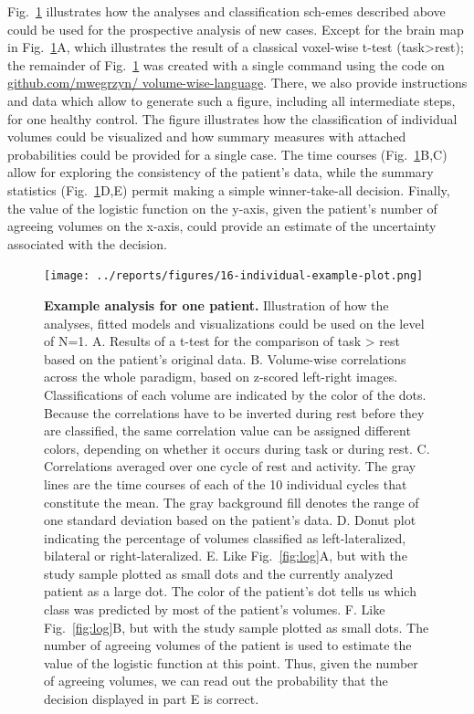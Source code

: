 \documentclass[fleqn,10pt]{SelfArx} %
\begin{document}
Fig.~\ref{fig:case} illustrates how the analyses and classification sch-emes described above could be used for the prospective analysis of new cases. Except for the brain map in Fig.~\ref{fig:case}A, which illustrates the result of a classical voxel-wise t-test (task>rest); the remainder of Fig.~\ref{fig:case} was created with a single command using the code on \href{https://github.com/mwegrzyn/volume-wise-language}{github.com/mwegrzyn/ volume-wise-language}. There, we also provide instructions and data which allow to generate such a figure, including all intermediate steps, for one healthy control. The figure illustrates how the classification of individual volumes could be visualized and how summary measures with attached probabilities could be provided for a single case. The time courses (Fig.~\ref{fig:case}B,C) allow for exploring the consistency of the patient’s data, while the summary statistics (Fig.~\ref{fig:case}D,E) permit making a simple winner-take-all decision. Finally, the value of the logistic function on the y-axis, given the patient’s number of agreeing volumes on the x-axis, could provide an estimate of the uncertainty associated with the decision.


\begin{figure}[htbp]
	\begin{minipage}{\textwidth}
		\renewcommand{\familydefault}{\sfdefault}\normalfont
		\centering
		\texttt{[image: ../reports/figures/16-individual-example-plot.png]}
		\caption{\textbf{Example analysis for one patient.} Illustration of how the analyses, fitted models and visualizations could be used on the level of N=1.
			A. Results of a t-test for the comparison of task > rest based on the patient’s original data.
			B. Volume-wise correlations across the whole paradigm, based on z-scored left-right images. Classifications of each volume are indicated by the color of the dots. Because the correlations have to be inverted during rest before they are classified, the same correlation value can be assigned different colors, depending on whether it occurs during task or during rest.
			C. Correlations averaged over one cycle of rest and activity. The gray lines are the time courses of each of the 10 individual cycles that constitute the mean. The gray background fill denotes the range of one standard deviation based on the patient’s data.
			D. Donut plot indicating the percentage of volumes classified as left-lateralized, bilateral or right-lateralized.
			E. Like Fig.~\ref{fig:log}A, but with the study sample plotted as small dots and the currently analyzed patient as a large dot. The color of the patient’s dot tells us which class was predicted by most of the patient’s volumes.
			F. Like Fig.~\ref{fig:log}B, but with the study sample plotted as small dots. The number of agreeing volumes of the patient is used to estimate the value of the logistic function at this point. Thus, given the number of agreeing volumes, we can read out the probability that the decision displayed in part E is correct.}%
		\label{fig:case}
	\end{minipage}
\end{figure}
\end{document}
